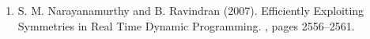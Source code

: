 \documentclass[BTech]{iitmdiss}
\begin{document}
\begin{enumerate}
\item S. M. Narayanamurthy and B. Ravindran (2007). \newblock
  Efficiently Exploiting Symmetries in Real Time Dynamic Programming. , pages 2556--2561.
\end{enumerate}


\pagebreak
\begin{singlespace}
  \begin{small}
	
  \end{small}
\end{singlespace}

\end{document}
